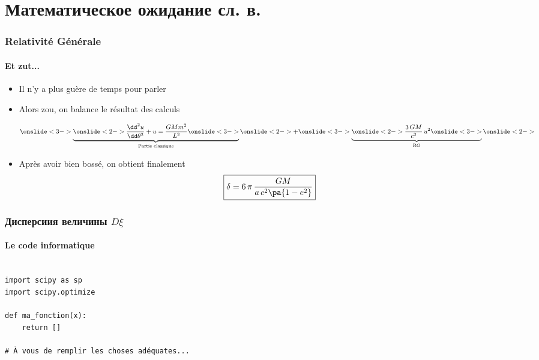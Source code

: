 \section{Математическое ожидание сл. в.}


\begin{frame}
\frametitle{Relativité Générale}
\framesubtitle{Et zut...}

\begin{itemize}
	\item	<1->	Il n'y a plus guère de temps pour parler
	\item	<2->	Alors zou, on balance le résultat des calculs

$$
    \onslide<3->
    \underbrace{
    \onslide<2->    
    \frac{\dd^2 u}{\dd \theta^2} + u 
        = 
        \frac{G M m^2}{L^2} 
    \onslide<3->
    }_{\text{Partie classique}}
    \onslide<2->
    + 
    \onslide<3->
    \underbrace{
    \onslide<2->    
    \frac{3\, G M}{c^2}\, u^2
    \onslide<3->
    }_{\text{RG}}
    \onslide<2->
$$

	\item	<4->	Après avoir bien bossé, on obtient finalement
$$
	\boxed{
		\delta = 6\, \pi \, \frac{G M}{a\, c^2\pa{1-e^2}}
			}
$$

\end{itemize}

\end{frame}



\begin{frame}[fragile]
\frametitle{
Дисперсиия величины $D \xi$}
\framesubtitle{Le code informatique}

\begin{code}
\begin{verbatim}

import scipy as sp
import scipy.optimize

def ma_fonction(x):
    return []

# À vous de remplir les choses adéquates...

\end{verbatim}
\end{code}
\end{frame}
